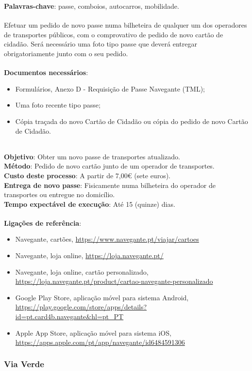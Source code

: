 \textbf{Palavras-chave}: passe, comboios, autocarros, mobilidade. \\
\\
Efetuar um pedido de novo passe numa bilheteira de qualquer um dos
operadores de transportes públicos, com o comprovativo de pedido de novo
cartão de cidadão. Será necessário uma foto tipo passe que deverá
entregar obrigatoriamente junto com o seu pedido. \\
\\
\textbf{Documentos necessários}:
\begin{itemize}
	\item Formulários, Anexo D - Requisição de Passe Navegante (TML);
	\item Uma foto recente tipo passe;
	\item Cópia traçada do novo Cartão de Cidadão ou cópia do pedido de novo Cartão de Cidadão.
\end{itemize}
\leavevmode\\
\textbf{Objetivo}: Obter um novo passe de transportes atualizado. \\
\textbf{Método}: Pedido de novo cartão junto de um operador de transportes. \\
\textbf{Custo deste processo}: A partir de 7,00€ (sete euros). \\
\textbf{Entrega de novo passe}: Fisicamente numa bilheteira do operador de transportes ou entregue no domicílio. \\
\textbf{Tempo expectável de execução}: Até 15 (quinze) dias. \\
\\
\textbf{Ligações de referência}:
\begin{itemize}
	\item Navegante, cartões, \url{https://www.navegante.pt/viajar/cartoes}
	\item Navegante, loja online, \url{https://loja.navegante.pt/}
	\item Navegante, loja online, cartão personalizado, \url{https://loja.navegante.pt/product/cartao-navegante-personalizado}
	\item Google Play Store, aplicação móvel para sistema Android, \url{https://play.google.com/store/apps/details?id=pt.card4b.navegante\&hl=pt\_PT}
	\item Apple App Store, aplicação móvel para sistema iOS, \url{https://apps.apple.com/pt/app/navegante/id6484591306}
\end{itemize}

\subsubsection{Via Verde}

